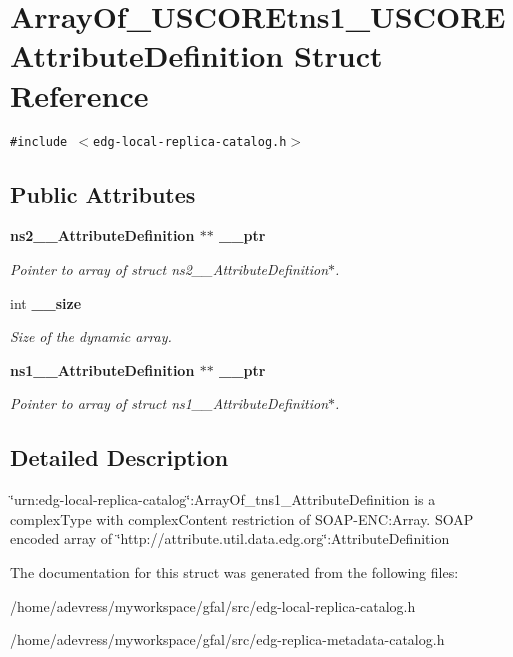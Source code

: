 \section{Array\-Of\_\-USCOREtns1\_\-USCOREAttribute\-Definition Struct Reference}
\label{structArrayOf__USCOREtns1__USCOREAttributeDefinition}
{\tt \#include $<$edg-local-replica-catalog.h$>$}

\subsection*{Public Attributes}
\begin{CompactItemize}
\item 
\bf{ns2\_\-\_\-Attribute\-Definition} $\ast$$\ast$ \bf{\_\-\_\-ptr}\label{structArrayOf__USCOREtns1__USCOREAttributeDefinition_829cfe4989a2404870040c0af3dd9a48}

\begin{CompactList}\small\item\em Pointer to array of struct ns2\_\-\_\-Attribute\-Definition$\ast$. \item\end{CompactList}\item 
int \bf{\_\-\_\-size}\label{structArrayOf__USCOREtns1__USCOREAttributeDefinition_3f167ff11f07d2e794e4eab428d5276d}

\begin{CompactList}\small\item\em Size of the dynamic array. \item\end{CompactList}\item 
\bf{ns1\_\-\_\-Attribute\-Definition} $\ast$$\ast$ \bf{\_\-\_\-ptr}\label{structArrayOf__USCOREtns1__USCOREAttributeDefinition_2fb94fbe0f97db3d663b3fc7da870fb2}

\begin{CompactList}\small\item\em Pointer to array of struct ns1\_\-\_\-Attribute\-Definition$\ast$. \item\end{CompactList}\end{CompactItemize}


\subsection{Detailed Description}
\char`\"{}urn:edg-local-replica-catalog\char`\"{}:Array\-Of\_\-tns1\_\-Attribute\-Definition is a complex\-Type with complex\-Content restriction of SOAP-ENC:Array. SOAP encoded array of \char`\"{}http://attribute.util.data.edg.org\char`\"{}:Attribute\-Definition 



The documentation for this struct was generated from the following files:\begin{CompactItemize}
\item 
/home/adevress/myworkspace/gfal/src/edg-local-replica-catalog.h\item 
/home/adevress/myworkspace/gfal/src/edg-replica-metadata-catalog.h\end{CompactItemize}
